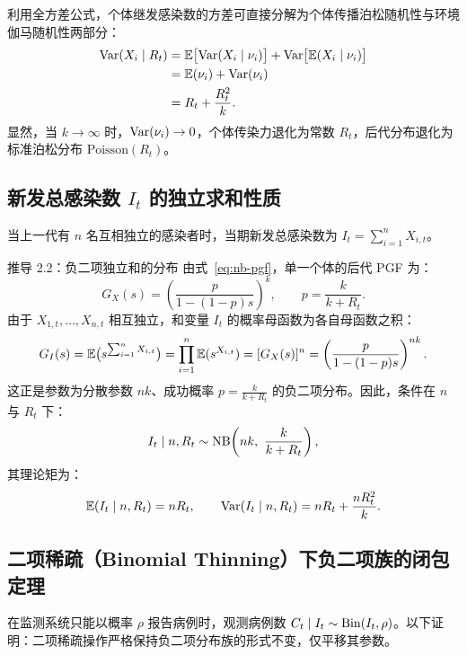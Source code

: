 利用全方差公式，个体继发感染数的方差可直接分解为个体传播泊松随机性与环境伽马随机性两部分：
\begin{align}
  \mathrm{Var}(X_i \mid R_t) &= \mathbb{E}\big[\mathrm{Var}(X_i \mid \nu_i)\big] + \mathrm{Var}\big[\mathbb{E}(X_i \mid \nu_i)\big] \nonumber \\
  &= \mathbb{E}(\nu_i) + \mathrm{Var}(\nu_i) \nonumber \\
  &= R_t + \frac{R_t^2}{k}.
  \label{eq:offspring}
\end{align}
显然，当 $k \to \infty$ 时，$\mathrm{Var}(\nu_i) \to 0$，个体传染力退化为常数 $R_t$，后代分布退化为标准泊松分布 $\text{Poisson}(R_t)$。

\subsection{新发总感染数 $I_t$ 的独立求和性质}

当上一代有 $n$ 名互相独立的感染者时，当期新发总感染数为 $I_t = \sum_{i=1}^n X_{i,t}$。

\begin{derivationbox}{推导 2.2：负二项独立和的分布}
由式~\eqref{eq:nb-pgf}，单一个体的后代 PGF 为：
\begin{equation}
  G_X(s) = \left( \frac{p}{1 - (1-p)s} \right)^k, \qquad p = \frac{k}{k+R_t}.
\end{equation}
由于 $X_{1,t}, \dots, X_{n,t}$ 相互独立，和变量 $I_t$ 的概率母函数为各自母函数之积：
\begin{equation}
  G_I(s) = \mathbb{E}\big(s^{\sum_{i=1}^n X_{i,t}}\big) = \prod_{i=1}^n \mathbb{E}(s^{X_{i,t}}) = [G_X(s)]^n = \left( \frac{p}{1 - (1-p)s} \right)^{nk}.
\end{equation}
这正是参数为分散参数 $nk$、成功概率 $p = \frac{k}{k+R_t}$ 的负二项分布。因此，条件在 $n$ 与 $R_t$ 下：
\begin{equation}
  I_t \mid n, R_t \sim \NB\!\left(nk,\ \frac{k}{k+R_t}\right),
\end{equation}
其理论矩为：
\begin{equation}
  \mathbb{E}(I_t \mid n, R_t) = n R_t, \qquad \mathrm{Var}(I_t \mid n, R_t) = n R_t + \frac{n R_t^2}{k}.
\end{equation}
\end{derivationbox}

\subsection{二项稀疏（Binomial Thinning）下负二项族的闭包定理}

在监测系统只能以概率 $\rho$ 报告病例时，观测病例数 $C_t \mid I_t \sim \mathrm{Bin}(I_t, \rho)$。以下证明：二项稀疏操作严格保持负二项分布族的形式不变，仅平移其参数。

